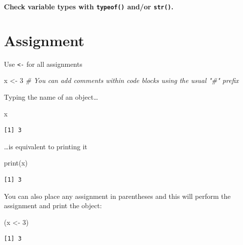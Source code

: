 \documentclass[
]{book}
\makeatletter
\newenvironment{Shaded}{\begin{snugshade}}{\end{snugshade}}
\newcommand{\CommentTok}[1]{\textcolor[rgb]{0.56,0.35,0.01}{\textit{#1}}}
\newcommand{\DecValTok}[1]{\textcolor[rgb]{0.00,0.00,0.81}{#1}}
\newcommand{\FunctionTok}[1]{\textcolor[rgb]{0.00,0.00,0.00}{#1}}
\newcommand{\NormalTok}[1]{#1}
\newcommand{\OtherTok}[1]{\textcolor[rgb]{0.56,0.35,0.01}{#1}}
\newenvironment{kframe}{%
\medskip{}
\setlength{\fboxsep}{.8em}
 \def\at@end@of@kframe{}%
 \ifinner\ifhmode%
  \def\at@end@of@kframe{\end{minipage}}%
  \begin{minipage}{\columnwidth}%
 \fi\fi%
 \def\FrameCommand##1{\hskip\@totalleftmargin \hskip-\fboxsep
 \colorbox{shadecolor}{##1}\hskip-\fboxsep
     \hskip-\linewidth \hskip-\@totalleftmargin \hskip\columnwidth}%
 \MakeFramed {\advance\hsize-\width
   \@totalleftmargin\z@ \linewidth\hsize
   \@setminipage}}%
 {\par\unskip\endMakeFramed%
 \at@end@of@kframe}
\newenvironment{rmdblock}[1]
  {
  \begin{itemize}
  \renewcommand{\labelitemi}{
    \raisebox{-.7\height}[0pt][0pt]{
      {\setkeys{Gin}{width=3em,keepaspectratio}\texttt{[image: images/\#1]}}
    }
  }
  \setlength{\fboxsep}{1em}
  \begin{kframe}
  \item
  }
  {
  \end{kframe}
  \end{itemize}
  }
\newenvironment{info}
  {\begin{rmdblock}{info}}
  {\end{rmdblock}}
\makeatother
\begin{document}
\begin{info}
\textbf{Check variable types with \texttt{typeof()} and/or
\texttt{str()}.}
\end{info}

\hypertarget{assignment}{%
\section{Assignment}\label{assignment}}

Use \texttt{\textless{}-} for all assignments

\begin{Shaded}
\begin{Highlighting}[]
\NormalTok{x }\OtherTok{\textless{}{-}} \DecValTok{3}
\CommentTok{\# You can add comments within code blocks using the usual "\#" prefix}
\end{Highlighting}
\end{Shaded}

Typing the name of an object\ldots{}

\begin{Shaded}
\begin{Highlighting}[]
\NormalTok{x}
\end{Highlighting}
\end{Shaded}

\begin{verbatim}
[1] 3
\end{verbatim}

\ldots is equivalent to printing it

\begin{Shaded}
\begin{Highlighting}[]
\FunctionTok{print}\NormalTok{(x)}
\end{Highlighting}
\end{Shaded}

\begin{verbatim}
[1] 3
\end{verbatim}

You can also place any assignment in parentheses and this will perform the assignment and print the object:

\begin{Shaded}
\begin{Highlighting}[]
\NormalTok{(x }\OtherTok{\textless{}{-}} \DecValTok{3}\NormalTok{)}
\end{Highlighting}
\end{Shaded}

\begin{verbatim}
[1] 3
\end{verbatim}
\end{document}
